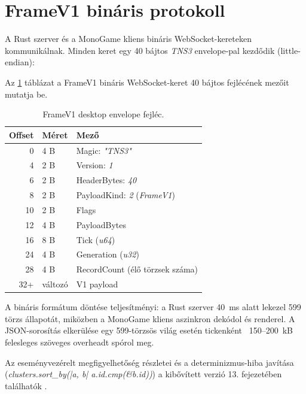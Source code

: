 \section{FrameV1 bináris protokoll}

A Rust szerver és a MonoGame kliens bináris WebSocket-kereteken kommunikálnak. Minden keret egy 40 bájtos \textit{TNS3} envelope-pal kezdődik (little-endian):

Az \ref{tab:framev1-envelope} táblázat a FrameV1 bináris WebSocket-keret 40 bájtos fejlécének mezőit mutatja be.

\begin{table}[H]
\centering
\caption{FrameV1 desktop envelope fejléc.}
\label{tab:framev1-envelope}
\begin{tabular}{|r|l|l|}
\hline
\textbf{Offset} & \textbf{Méret} & \textbf{Mező} \\
\hline
0  & 4 B & Magic: \textit{"TNS3"} \\
4  & 2 B & Version: \textit{1} \\
6  & 2 B & HeaderBytes: \textit{40} \\
8  & 2 B & PayloadKind: \textit{2} (\textit{FrameV1}) \\
10 & 2 B & Flags \\
12 & 4 B & PayloadBytes \\
16 & 8 B & Tick (\textit{u64}) \\
24 & 4 B & Generation (\textit{u32}) \\
28 & 4 B & RecordCount (élő törzsek száma) \\
32+ & változó & V1 payload \\
\hline
\end{tabular}
\end{table}

A bináris formátum döntése teljesítményi: a Rust szerver 40~ms alatt lekezel 599 törzs állapotát, miközben a MonoGame kliens aszinkron dekódol és renderel. A JSON-sorosítás elkerülése egy 599-törzsös világ esetén tickenként ~150–200~kB felesleges szöveges overheadt spórol meg.

Az eseményvezérelt megfigyelhetőség részletei és a determinizmus-hiba javítása \\ (\textit{clusters.sort\_by(|a, b| a.id.cmp(\&b.id))}) a kibővített verzió 13. fejezetében találhatók \cite{premadegraph-full}.

